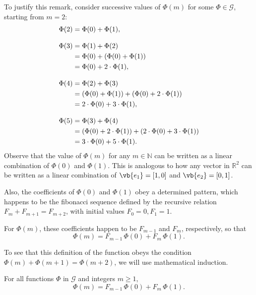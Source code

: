 \begin{enumerate}
\begin{enumerate}
                To justify this remark, consider successive values of $\Phi(m)$ for some $\Phi \in \mathscr{G}$, starting from $m = 2$:
                \begin{align*}
                    \Phi(2) &= \Phi(0) + \Phi(1), \\[3\jot]
                    \Phi(3) &= \Phi(1) + \Phi(2) \\
                    &= \Phi(0) + (\Phi(0) + \Phi(1)) \\
                    &= \Phi(0) + 2 \cdot \Phi(1), \\[3\jot]
                    \Phi(4) &= \Phi(2) + \Phi(3) \\
                    &= (\Phi(0) + \Phi(1)) + (\Phi(0) + 2 \cdot \Phi(1)) \\
                    &= 2 \cdot \Phi(0) + 3 \cdot \Phi(1), \\[3\jot]
                    \Phi(5) &= \Phi(3) + \Phi(4) \\
                    &= (\Phi(0) + 2 \cdot \Phi(1)) + (2 \cdot \Phi(0) + 3 \cdot \Phi(1)) \\
                    &= 3 \cdot \Phi(0) + 5 \cdot \Phi(1).
                \end{align*}
                Observe that the value of $\Phi(m)$ for any $m \in \mathbb{N}$ can be written as a linear combination of $\Phi(0)$ and $\Phi(1)$.
                This is analogous to how any vector in $\mathbb{R}^2$ can be written as a linear combination of $\vb{e_1} = [1, 0]$ and $\vb{e_2} = [0, 1]$.

                Also, the coefficients of $\Phi(0)$ and $\Phi(1)$ obey a determined pattern, which happens to be the fibonacci sequence defined by the recursive relation $F_m + F_{m + 1} = F_{m + 2}$, with initial values $F_0 = 0, F_1 = 1$.

                For $\Phi(m)$, these coefficients happen to be $F_{m - 1}$ and $F_m$, respectively, so that
                \[ \Phi(m) = F_{m - 1} \, \Phi(0) + F_m \, \Phi(1). \]

                To see that this definition of the function obeys the condition $\Phi(m) + \Phi(m + 1) = \Phi(m + 2)$, we will use mathematical induction.

                \medskip

                \begin{proposition} \label{prop:11}
                    For all functions $\Phi$ in $\mathscr{G}$ and integers $m \ge 1$,
                    \[ \Phi(m) = F_{m - 1} \, \Phi(0) + F_m \, \Phi(1). \]
                \end{proposition}


\end{enumerate}
\end{enumerate}
